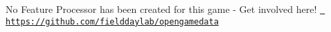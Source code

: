 No Feature Processor has been created for this game -\/ Get involved here! \href{https://github.com/fielddaylab/opengamedata}{\texttt{ https\+://github.\+com/fielddaylab/opengamedata}} 